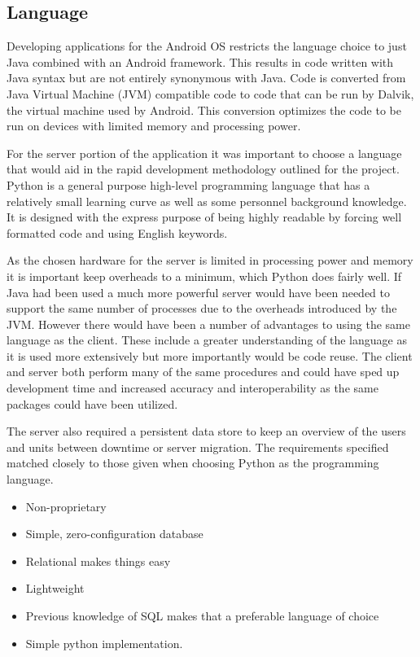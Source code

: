 \subsection{Language}
Developing applications for the Android OS restricts the language choice to just Java combined with an Android framework. This results in code written with Java syntax but are not entirely synonymous with Java. Code is converted from Java Virtual Machine (JVM) compatible code to code that can be run by Dalvik, the virtual machine used by Android. This conversion optimizes the code to be run on devices with limited memory and processing power.

For the server portion of the application it was important to choose a language that would aid in the rapid development methodology outlined for the project. Python is a general purpose high-level programming language that has a relatively small learning curve as well as some personnel background knowledge. It is designed with the express purpose of being highly readable by forcing well formatted code and using English keywords. 

As the chosen hardware for the server is limited in processing power and memory it is important keep overheads to a minimum, which Python does fairly well. If Java had been used a much more powerful server would have been needed to support the same number of processes due to the overheads introduced by the JVM. However there would have been a number of advantages to using the same language as the client. These include a greater understanding of the language as it is used more extensively but more importantly would be code reuse. The client and server both perform many of the same procedures and could have sped up development time and increased accuracy and interoperability as the same packages could have been utilized.

The server also required a persistent data store to keep an overview of the users and units between downtime or server migration. The requirements specified matched closely to those given when choosing Python as the programming language. 

\begin{itemize}
\item Non-proprietary
\item Simple, zero-configuration database
\item Relational makes things easy
\item Lightweight
\item Previous knowledge of SQL makes that a preferable language of choice
\item Simple python implementation.
\end{itemize}

